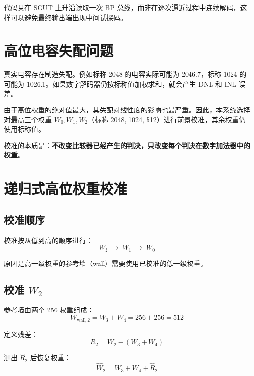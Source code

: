 \documentclass[
  UTF8,
  a4paper,
  11pt,
  oneside,
  fontset=fandol
]{ctexrep}
\newcommand{\What}{\widehat{W}}
\newcommand{\Rhat}{\widehat{R}}
\begin{document}
代码只在 SOUT 上升沿读取一次 BP 总线，而非在逐次逼近过程中连续解码，这样可以避免最终输出端出现中间试探码。

\chapter{高位电容失配问题}

真实电容存在制造失配。例如标称 \SI{2048}{\LSB} 的电容实际可能为 \SI{2046.7}{\LSB}，标称 \SI{1024}{\LSB} 的可能为 \SI{1026.1}{\LSB}。如果数字解码器仍按标称值加权求和，就会产生 DNL 和 INL 误差。

由于高位权重的绝对值最大，其失配对线性度的影响也最严重。因此，本系统选择对最高三个权重 $W_0, W_1, W_2$（标称 2048, 1024, \SI{512}{\LSB}）进行前景校准，其余权重仍使用标称值。

校准的本质是：\textbf{不改变比较器已经产生的判决，只改变每个判决在数字加法器中的权重}。

\chapter{递归式高位权重校准}

\section{校准顺序}

校准按从低到高的顺序进行：
\begin{equation}
\boxed{W_2 \;\to\; W_1 \;\to\; W_0}
\end{equation}

原因是高一级权重的参考墙（wall）需要使用已校准的低一级权重。

\section{校准 $W_2$}

参考墙由两个 \SI{256}{\LSB} 权重组成：
\begin{equation}
W_{\mathrm{wall},2} = W_3 + W_4 = 256 + 256 = 512
\end{equation}

定义残差：
\begin{equation}
R_2 = W_2 - (W_3 + W_4)
\label{eq:R2}
\end{equation}

测出 $\Rhat_2$ 后恢复权重：
\begin{equation}
\boxed{\What_2 = W_3 + W_4 + \Rhat_2}
\label{eq:What2}
\end{equation}
\end{document}
